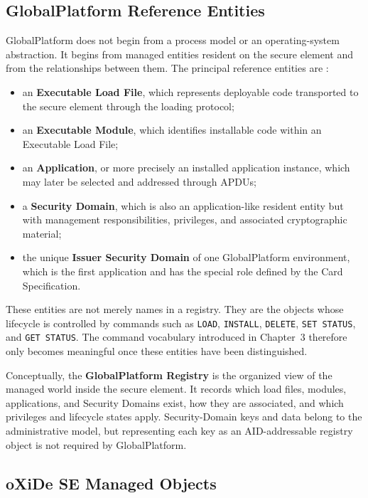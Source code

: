 \subsection{GlobalPlatform Reference Entities}

GlobalPlatform does not begin from a process model or an operating-system
abstraction. It begins from managed entities resident on the secure element
and from the relationships between them. The principal reference entities are
:

\begin{itemize}
\item an \textbf{Executable Load File}, which represents deployable code
  transported to the secure element through the loading protocol;
\item an \textbf{Executable Module}, which identifies installable code within
  an Executable Load File;
\item an \textbf{Application}, or more precisely an installed application
  instance, which may later be selected and addressed through APDUs;
\item a \textbf{Security Domain}, which is also an application-like
  resident entity but with management responsibilities, privileges, and
  associated cryptographic material;
\item the unique \textbf{Issuer Security Domain} of one GlobalPlatform
  environment, which is the first application and has the special role
  defined by the Card Specification.
\end{itemize}

These entities are not merely names in a registry. They are the objects
whose lifecycle is controlled by commands such as \texttt{LOAD},
\texttt{INSTALL}, \texttt{DELETE}, \texttt{SET STATUS}, and
\texttt{GET STATUS}. The command vocabulary introduced in Chapter~3
therefore only becomes meaningful once these entities have been
distinguished.

Conceptually, the \textbf{GlobalPlatform Registry} is the organized view of
the managed world inside the secure element. It records which load files,
modules, applications, and Security Domains exist, how they are associated,
and which privileges and lifecycle states apply. Security-Domain keys and data
belong to the administrative model, but representing each key as an
AID-addressable registry object is not required by GlobalPlatform.

\subsection{oXiDe SE Managed Objects}

